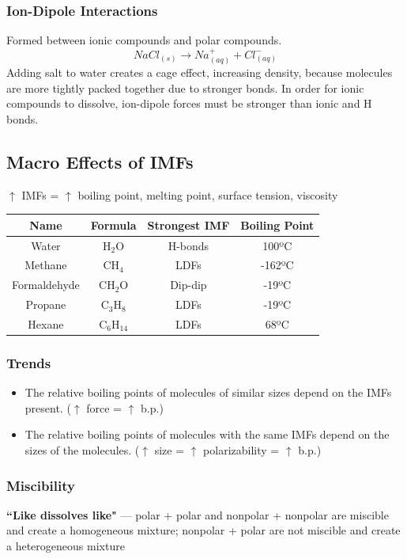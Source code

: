 \documentclass[a4paper, 12pt]{article}
\begin{document}
\subsubsection*{Ion-Dipole Interactions}
Formed between ionic compounds and polar compounds.
$$NaCl_{(s)} \longrightarrow Na^+_{(aq)} + Cl^-_{(aq)}$$
Adding salt to water creates a cage effect, increasing density, because molecules are more tightly packed together due to stronger bonds. In order for ionic compounds to dissolve, ion-dipole forces must be stronger than ionic and H bonds.

\subsection*{Macro Effects of IMFs}
$\uparrow$ IMFs = $\uparrow$ boiling point, melting point, surface tension, viscosity
 
\begin{centering}

\begin{tabular}{c|c|c|c}
    \textbf{Name} & \textbf{Formula} & \textbf{Strongest IMF} & \textbf{Boiling Point} \\\hline
    Water & H$_2$O & H-bonds & 100ºC \\
    Methane & CH$_4$ & LDFs & -162ºC \\
    Formaldehyde & CH$_2$O & Dip-dip & -19ºC \\
    Propane & C$_3$H$_8$ & LDFs & -19ºC \\
    Hexane & C$_6$H$_{14}$ & LDFs & 68ºC
\end{tabular}

\end{centering}

\subsubsection*{Trends}
\begin{itemize}[leftmargin=*, nosep]
    \item The relative boiling points of molecules of similar sizes depend on the IMFs present. ($\uparrow$ force = $\uparrow$ b.p.)
    \item The relative boiling points of molecules with the same IMFs depend on the sizes of the molecules. ($\uparrow$ size = $\uparrow$ polarizability = $\uparrow$ b.p.)
\end{itemize}

\subsubsection*{Miscibility}
\textbf{``Like dissolves like"} --- polar + polar and nonpolar + nonpolar are miscible and create a homogeneous mixture; nonpolar + polar are not miscible and create a heterogeneous mixture
\end{document}
